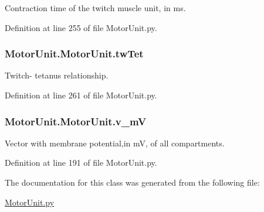 Contraction time of the twitch muscle unit, in ms. 



Definition at line 255 of file Motor\-Unit.\-py.

\hypertarget{class_motor_unit_1_1_motor_unit_a2a466c5f2f798901c1c438f9d57c2221}{
\subsubsection[{tw\-Tet}]{\setlength{\rightskip}{0pt plus 5cm}Motor\-Unit.\-Motor\-Unit.\-tw\-Tet}}\label{class_motor_unit_1_1_motor_unit_a2a466c5f2f798901c1c438f9d57c2221}


Twitch-\/ tetanus relationship. 



Definition at line 261 of file Motor\-Unit.\-py.

\hypertarget{class_motor_unit_1_1_motor_unit_aa8968f89250895ae2ae572e9106709f2}{
\subsubsection[{v\-\_\-m\-V}]{\setlength{\rightskip}{0pt plus 5cm}Motor\-Unit.\-Motor\-Unit.\-v\-\_\-m\-V}}\label{class_motor_unit_1_1_motor_unit_aa8968f89250895ae2ae572e9106709f2}


Vector with membrane potential,in m\-V, of all compartments. 



Definition at line 191 of file Motor\-Unit.\-py.



The documentation for this class was generated from the following file\-:\begin{DoxyCompactItemize}
\item 
\hyperlink{_motor_unit_8py}{Motor\-Unit.\-py}\end{DoxyCompactItemize}
